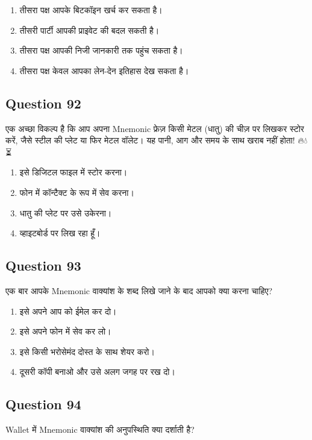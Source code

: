 \documentclass[12pt,a4paper]{article}
\begin{document}
\begin{enumerate}[label=\Alph*., leftmargin=*]
\item तीसरा पक्ष आपके बिटकॉइन खर्च कर सकता है।
\item तीसरी पार्टी आपकी प्राइवेट की बदल सकती है।
\item तीसरा पक्ष आपकी निजी जानकारी तक पहुंच सकता है।
\item तीसरा पक्ष केवल आपका लेन-देन इतिहास देख सकता है।
\end{enumerate}

\bigskip


\subsection*{Question 92}
एक अच्छा विकल्प है कि आप अपना Mnemonic फ्रेज़ किसी मेटल (धातु) की चीज़ पर लिखकर स्टोर करें, जैसे स्टील की प्लेट या फिर मेटल वॉलेट। यह पानी, आग और समय के साथ खराब नहीं होता! 🔥💧⏳

\begin{enumerate}[label=\Alph*., leftmargin=*]
\item इसे डिजिटल फाइल में स्टोर करना।
\item फोन में कॉन्टैक्ट के रूप में सेव करना।
\item धातु की प्लेट पर उसे उकेरना।
\item व्हाइटबोर्ड पर लिख रहा हूँ।
\end{enumerate}

\bigskip


\subsection*{Question 93}
एक बार आपके Mnemonic वाक्यांश के शब्द लिखे जाने के बाद आपको क्या करना चाहिए?

\begin{enumerate}[label=\Alph*., leftmargin=*]
\item इसे अपने आप को ईमेल कर दो।
\item इसे अपने फोन में सेव कर लो।
\item इसे किसी भरोसेमंद दोस्त के साथ शेयर करो।
\item दूसरी कॉपी बनाओ और उसे अलग जगह पर रख दो।
\end{enumerate}

\bigskip


\subsection*{Question 94}
Wallet में Mnemonic वाक्यांश की अनुपस्थिति क्या दर्शाती है?
\end{document}
